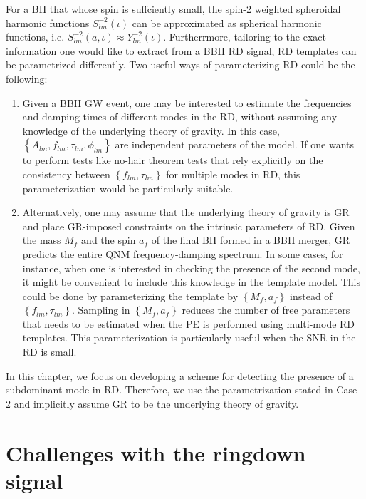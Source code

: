 For a BH that whose spin is suffciently small, the spin-2 weighted spheroidal harmonic functions $S_{lm}^{-2}(\iota)$ can be approximated as spherical harmonic functions, i.e. $S_{lm}^{-2}(a,\iota) \approx Y_{lm}^{-2}(\iota)$. Furtherrmore, tailoring to the exact information one would like to extract from a BBH RD signal, RD templates can be parametrized differently. Two useful ways of parameterizing RD could be the following:
\begin{enumerate}
\item Given a BBH GW event, one may be interested to estimate the frequencies and damping times of different modes in the RD, without assuming any knowledge of the underlying theory of gravity. In this case, $\left\lbrace A_{lm}, f_{lm},\tau_{lm},  \phi_{lm} \right\rbrace$ are independent parameters of the model. If one wants to perform tests like no-hair theorem tests that rely explicitly on the consistency between  $\left\lbrace f_{lm},\tau_{lm}\right\rbrace$ for multiple modes in RD, this parameterization would be particularly suitable.
\item Alternatively, one may assume that the underlying theory of gravity is GR and place GR-imposed constraints on the intrinsic parameters of RD. Given the mass $M_{f}$ and the spin $a_{f}$ of the final BH formed in a BBH merger, GR predicts the entire QNM frequency-damping spectrum. In some cases, for instance, when one is interested in checking the presence of the second mode, it might be convenient to include this knowledge in the template model. This could be done by parameterizing the template by $\left\lbrace M_{f}, a_{f} \right\rbrace$ instead of $\left\lbrace f_{lm},\tau_{lm}\right\rbrace$. Sampling in $\left\lbrace M_{f}, a_{f} \right\rbrace$ reduces the number of free parameters that needs to be estimated when the PE is performed using multi-mode RD templates. This parameterization is particularly useful when the SNR in the RD is small. 
\end{enumerate}
In this chapter, we focus on developing a scheme for detecting the presence of a subdominant mode in RD. Therefore, we use the parametrization stated in  Case 2 and implicitly assume GR to be the underlying theory of gravity.  

\section{Challenges with the ringdown signal}
\label{sec:RDPE-problems}

